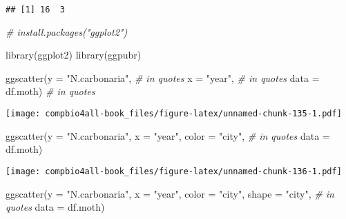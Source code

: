 \documentclass[
]{book}
\newenvironment{Shaded}{\begin{snugshade}}{\end{snugshade}}
\newcommand{\AttributeTok}[1]{\textcolor[rgb]{0.77,0.63,0.00}{#1}}
\newcommand{\CommentTok}[1]{\textcolor[rgb]{0.56,0.35,0.01}{\textit{#1}}}
\newcommand{\FunctionTok}[1]{\textcolor[rgb]{0.00,0.00,0.00}{#1}}
\newcommand{\NormalTok}[1]{#1}
\newcommand{\StringTok}[1]{\textcolor[rgb]{0.31,0.60,0.02}{#1}}
\begin{document}
\begin{verbatim}
## [1] 16  3
\end{verbatim}

\begin{Shaded}
\begin{Highlighting}[]
\CommentTok{\# install.packages("ggplot2")}
\end{Highlighting}
\end{Shaded}

\begin{Shaded}
\begin{Highlighting}[]
\FunctionTok{library}\NormalTok{(ggplot2)}
\FunctionTok{library}\NormalTok{(ggpubr)}
\end{Highlighting}
\end{Shaded}

\begin{Shaded}
\begin{Highlighting}[]
\FunctionTok{ggscatter}\NormalTok{(}\AttributeTok{y =} \StringTok{"N.carbonaria"}\NormalTok{,   }\CommentTok{\# in quotes}
          \AttributeTok{x =} \StringTok{"year"}\NormalTok{,           }\CommentTok{\# in quotes}
          \AttributeTok{data =}\NormalTok{ df.moth)       }\CommentTok{\# in quotes}
\end{Highlighting}
\end{Shaded}

\texttt{[image: compbio4all-book\_files/figure-latex/unnamed-chunk-135-1.pdf]}

\begin{Shaded}
\begin{Highlighting}[]
\FunctionTok{ggscatter}\NormalTok{(}\AttributeTok{y =} \StringTok{"N.carbonaria"}\NormalTok{, }
          \AttributeTok{x =} \StringTok{"year"}\NormalTok{,}
          \AttributeTok{color =} \StringTok{"city"}\NormalTok{,    }\CommentTok{\# in quotes}
          \AttributeTok{data =}\NormalTok{ df.moth)}
\end{Highlighting}
\end{Shaded}

\texttt{[image: compbio4all-book\_files/figure-latex/unnamed-chunk-136-1.pdf]}

\begin{Shaded}
\begin{Highlighting}[]
\FunctionTok{ggscatter}\NormalTok{(}\AttributeTok{y =} \StringTok{"N.carbonaria"}\NormalTok{,}
          \AttributeTok{x =} \StringTok{"year"}\NormalTok{,}
          \AttributeTok{color =} \StringTok{"city"}\NormalTok{,}
          \AttributeTok{shape =} \StringTok{"city"}\NormalTok{,     }\CommentTok{\# in quotes}
          \AttributeTok{data =}\NormalTok{ df.moth)}
\end{Highlighting}
\end{Shaded}
\end{document}
